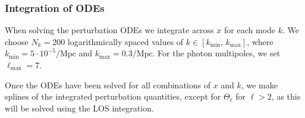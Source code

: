 \subsubsection{Integration of ODEs} \label{sssec:M3:implementations:integration_details}

When solving the perturbation ODEs we integrate across $x$ for each mode $k$. We choose $N_k=200$ logarithmically spaced values of $k\in[k_\mathrm{min},\,k_\mathrm{max}]$, where $k_\mathrm{min}=5\cdot10^{-5}/\mathrm{Mpc}$ and $k_\mathrm{max}=0.3/\mathrm{Mpc}$. For the photon multipoles, we set $\ell_\mathrm{max}=7$.

Once the ODEs have been solved for all combinations of $x$ and $k$, we make splines of the integrated perturbation quantities, except for $\Theta_\ell$ for $\ell>2$, as this will be solved using the LOS integration. 